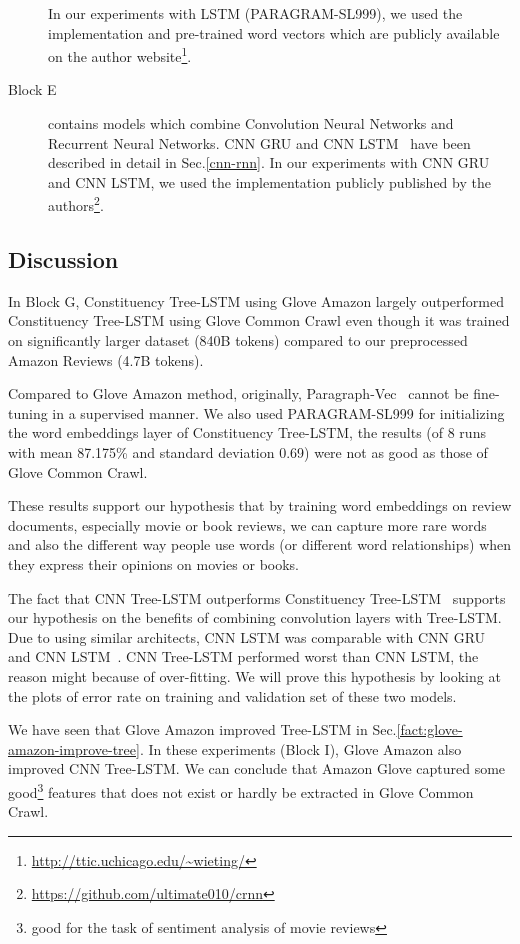 \begin{description}
	In our experiments with LSTM (PARAGRAM-SL999), we used the implementation and pre-trained word vectors which are publicly available on the author website\footnote{\url{http://ttic.uchicago.edu/~wieting/}}.
	\item[Block E] contains models which combine Convolution Neural Networks and Recurrent Neural Networks.
	CNN GRU and CNN LSTM~\cite{cnn-rnn} have been described in detail in Sec.\ref{cnn-rnn}.
	In our experiments with CNN GRU and CNN LSTM, we used the implementation publicly published by the authors\footnote{\url{https://github.com/ultimate010/crnn}}.
\end{description}
\subsection{Discussion}
In Block G, Constituency Tree-LSTM using Glove Amazon largely outperformed Constituency Tree-LSTM using Glove Common Crawl even though it was trained on significantly larger dataset (840B tokens) compared to our preprocessed Amazon Reviews (4.7B tokens).

Compared to Glove Amazon method, originally,  Paragraph-Vec~\cite{ParagraphVec} cannot be fine-tuning in a supervised manner.
We also used PARAGRAM-SL999 for initializing the word embeddings layer of Constituency Tree-LSTM,
the results (of 8 runs with mean 87.175\% and standard deviation 0.69) were not as good as those of Glove Common Crawl.

These results support our hypothesis that by training word embeddings on review documents, especially movie or book reviews, we can capture more rare words and also the different way people use words (or different word relationships) when they express their opinions on movies or books.

The fact that CNN Tree-LSTM outperforms Constituency Tree-LSTM~\cite{treeLSTM} supports our hypothesis on the benefits of combining convolution layers with Tree-LSTM.
Due to using similar architects, CNN LSTM was comparable with CNN GRU and CNN LSTM~\cite{cnn-rnn}. \label{unproved:cnn-treelstm-overfit}
CNN Tree-LSTM performed worst than CNN LSTM, the reason might because of over-fitting.
We will prove this hypothesis by looking at the plots of error rate on training and validation set of these two models.

\label{proved:Amazon-adv-Common}
We have seen that Glove Amazon improved Tree-LSTM in Sec.\ref{fact:glove-amazon-improve-tree}.
In these experiments (Block I), Glove Amazon also improved CNN Tree-LSTM.
We can conclude that Amazon Glove captured some good\footnote{good for the task of sentiment analysis of movie reviews} features that does not exist or hardly be extracted in Glove Common Crawl.

